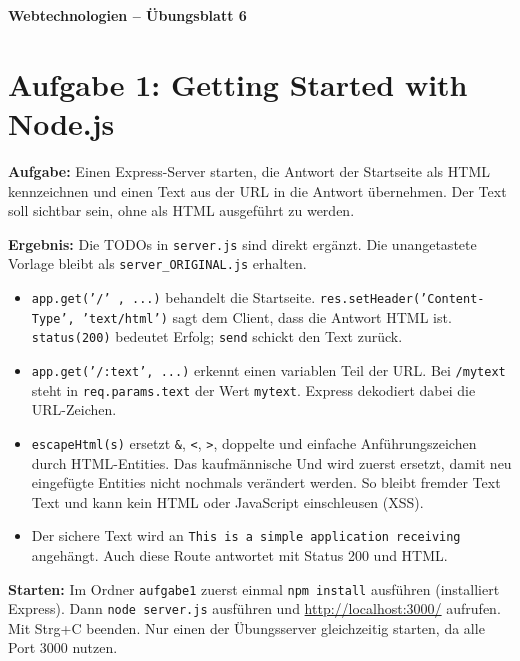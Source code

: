 \documentclass[11pt,a4paper]{article}
\begin{document}
\begin{center}
  {\Large\textbf{Webtechnologien -- Übungsblatt 6}}
\end{center}
\section*{Aufgabe 1: Getting Started with Node.js}
\textbf{Aufgabe:} Einen Express-Server starten, die Antwort der Startseite
als HTML kennzeichnen und einen Text aus der URL in die Antwort übernehmen.
Der Text soll sichtbar sein, ohne als HTML ausgeführt zu werden.

\medskip
\textbf{Ergebnis:} Die TODOs in \texttt{server.js} sind direkt ergänzt.
Die unangetastete Vorlage bleibt als \texttt{server\_ORIGINAL.js} erhalten.
\begin{itemize}
  \item \texttt{app.get('/' , ...)} behandelt die Startseite.
    \texttt{res.setHeader('Content-Type', 'text/html')} sagt dem Client,
    dass die Antwort HTML ist. \texttt{status(200)} bedeutet Erfolg;
    \texttt{send} schickt den Text zurück.
  \item \texttt{app.get('/:text', ...)} erkennt einen variablen Teil der
    URL. Bei \texttt{/mytext} steht in \texttt{req.params.text} der Wert
    \texttt{mytext}. Express dekodiert dabei die URL-Zeichen.
  \item \texttt{escapeHtml(s)} ersetzt \texttt{\&}, \texttt{<},
    \texttt{>}, doppelte und einfache Anführungszeichen durch HTML-Entities.
    Das kaufmännische Und wird zuerst ersetzt, damit neu eingefügte
    Entities nicht nochmals verändert werden. So bleibt fremder Text Text
    und kann kein HTML oder JavaScript einschleusen (XSS).
  \item Der sichere Text wird an
    \texttt{This is a simple application receiving } angehängt.
    Auch diese Route antwortet mit Status 200 und HTML.
\end{itemize}

\textbf{Starten:} Im Ordner \texttt{aufgabe1} zuerst einmal
\texttt{npm install} ausführen (installiert Express). Dann \texttt{node server.js} ausführen und
\url{http://localhost:3000/} aufrufen. Mit Strg+C beenden.
Nur einen der Übungsserver gleichzeitig starten, da alle Port 3000 nutzen.
\end{document}
